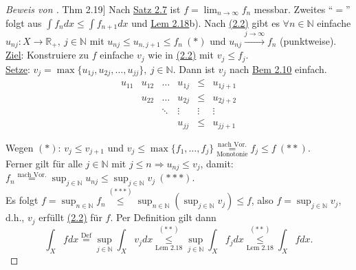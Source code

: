 \documentclass[a4paper]{report}
\newcommand{\R}{\mathbb{R}}
\newcommand{\N}{\mathbb{N}}
\newcommand{\toInf}{\rightarrow \infty}
\newcommand{\limToInf}[1]{\lim_{#1 \toInf}}
\newcommand{\overunderset}[3]{\overset{#1}{\underset{#3}{#2}}}
\newcommand{\jshortlink}[1]{\jhyperref{#1}{\text{#1}}}
\newcommand{\jhyperref}[2]{\hyperref[j_#1]{#2}}
\newcommand{\jlink}[1]{\jhyperref{#1}{#1}}
\newcommand{\jabb}[3]{ #1: #2 \rightarrow #3 }
\theoremstyle{plain}
\theoremstyle{definition}
\begin{document}
{{{\begin{proof}[Beweis von \jlink{Thm 2.19}]
    Nach \jlink{Satz 2.7} ist $f = \limToInf{n} f_n$ messbar. Zweites ``$=$'' folgt aus $\int f_n dx \le \int f_{n+1} dx$ und \jlink{Lem 2.18}b). Nach \jlink{(2.2)} gibt es $\forall n\in\N$ einfache $\jabb{u_{nj}}{X}{\R_+}, \ j\in\N$ mit $u_{nj} \le u_{n,j+1} \le f_n \ (*)$ und $u_{nj} \xrightarrow{j\rightarrow \infty} f_n$ (punktweise).\\
    \uline{Ziel}: Konstruiere zu $f$ einfache $v_j$ wie in \jlink{(2.2)} mit $v_j \le f_j$.\\
    \uline{Setze}: $v_j = \max \{u_{1j}, u_{2j},\dots, u_{jj}\}, \ j\in\N$. Dann ist $v_j$ nach \jlink{Bem 2.10} einfach.
    \[
        \begin{matrix}
            u_{11} & u_{12} & \dots  & u_{1j} & \le    & u_{1j+1} \\
                   & u_{22} & \dots  & u_{2j} & \le    & u_{2j+2} \\
                   &        & \ddots & \vdots & \vdots & \vdots   \\
                   &        &        & u_{jj} & \le    & u_{jj+1} 
        \end{matrix}
    \]
    
    Wegen $(*)$: $v_j\le v_{j+1}$ und $v_j \le \max \{f_1, \dots, f_j\} \overset{\text{nach Vor.}}{\underset{\text{Monotonie}}{=}} f_j \le f \ (**)$.\\
    Ferner gilt für alle $j\in\N$ mit $j\le n \Rightarrow u_{nj} \le v_j$, damit:\\
    $f_n \overset{\text{nach Vor.}}{=} \sup_{j\in\N} u_{nj} \le \sup_{j\in\N} v_j \ (***)$.\\
    Es folgt $f = \sup_{n\in\N} f_n \overset{(***)}{\le} \sup_{n\in\N} (\sup_{j\in\N} v_j) \le f$, also $f=\sup_{j\in\N} v_j$, d.h., $v_j$ erfüllt \jlink{(2.2)} für $f$. Per Definition gilt dann
    \begin{displaymath}
        \int_X f dx \overset{\text{Def}}{=} \sup_{j\in\N} \int_X v_j dx \overset{(**)}{\underset{\jshortlink{Lem 2.18}}{\le}} \sup_{j\in\N} \int_X f_j dx \overunderset{(**)}{\le}{\jshortlink{Lem 2.18}} \int_X f dx.
    \end{displaymath}
\end{proof}


}}}
\end{document}
